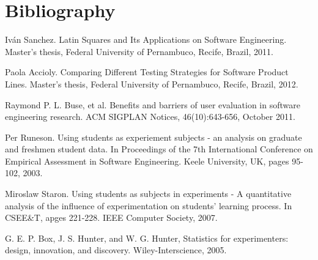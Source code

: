 \chapter{Bibliography}

\begin{thebibliography}{4}

 Iván Sanchez. Latin Squares and Its Applications on Software Engineering. Master's thesis, Federal University of Pernambuco, Recife, Brazil, 2011.

 Paola Accioly. Comparing Different Testing Strategies for Software Product Lines. Master's thesis, Federal University of Pernambuco, Recife, Brazil, 2012.

 Raymond P. L. Buse, et al. Benefits and barriers of user evaluation in software engineering research. ACM SIGPLAN Notices, 46(10):643-656, October 2011.

 Per Runeson. Using students as experiement subjects - an analysis on graduate and freshmen student data. In Proceedings of the 7th International Conference on Empirical Assessment in Software Engineering. Keele University, UK, pages 95-102, 2003.

 Miroslaw Staron. Using students as subjects in experiments - A quantitative analysis of the influence of experimentation on students' learning process. In CSEE&T, apges 221-228. IEEE Computer Society, 2007.

 G. E. P. Box, J. S. Hunter, and W. G. Hunter, Statistics for experimenters: design, innovation, and discovery. Wiley-Interscience, 2005.

\end{thebibliography}
